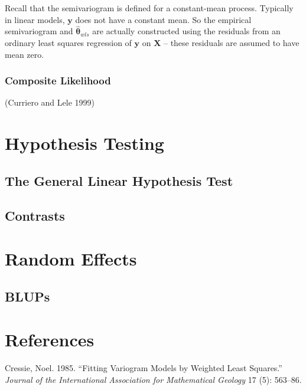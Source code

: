\documentclass{article}
\begin{document}
Recall that the semivariogram is defined for a constant-mean process.
Typically in linear models, \(\mathbf{y}\) does not have a constant
mean. So the empirical semivariogram and \(\bm{\hat{\theta}}_{wls}\) are
actually constructed using the residuals from an ordinary least squares
regression of \(\mathbf{y}\) on \(\mathbf{X}\) -- these residuals are
assumed to have mean zero.

\hypertarget{composite-likelihood}{%
\subsubsection{Composite Likelihood}\label{composite-likelihood}}

(Curriero and Lele 1999)

\hypertarget{hypothesis-testing}{%
\section{Hypothesis Testing}\label{hypothesis-testing}}

\hypertarget{the-general-linear-hypothesis-test}{%
\subsection{The General Linear Hypothesis
Test}\label{the-general-linear-hypothesis-test}}

\hypertarget{contrasts}{%
\subsection{Contrasts}\label{contrasts}}

\hypertarget{random-effects}{%
\section{Random Effects}\label{random-effects}}

\hypertarget{blups}{%
\subsection{BLUPs}\label{blups}}

\hypertarget{references}{%
\section*{References}\label{references}}

\hypertarget{refs}{}
\leavevmode\hypertarget{ref-cressie1985fitting}{}%
Cressie, Noel. 1985. ``Fitting Variogram Models by Weighted Least
Squares.'' \emph{Journal of the International Association for
Mathematical Geology} 17 (5): 563--86.
\end{document}
